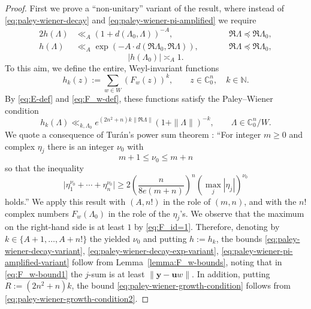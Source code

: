 \documentclass[11pt,oneside]{amsart}
\numberwithin{equation}{section}
\theoremstyle{remark}
\theoremstyle{plain}
\newcommand\NN{\mathbb{N}}
\newcommand\CC{\mathbb{C}}
\newcommand{\bu}{\mathbf{u}}
\newcommand{\by}{\mathbf{y}}
\renewcommand\leq{\leqslant}
\renewcommand\geq{\geqslant}
\begin{document}
\begin{proof} First we prove a ``non-unitary'' variant of the result, where instead of \eqref{eq:paley-wiener-decay} and \eqref{eq:paley-wiener-pi-amplified} we require
\begin{alignat}{2}
\label{eq:paley-wiener-decay-variant}
h(\Lambda)&\ll_A (1+d(\Lambda_0,\Lambda))^{-A},&&\qquad\Re\Lambda\preceq\Re\Lambda_0,\\
\label{eq:paley-wiener-decay-exp-variant}
h(\Lambda)&\ll_A \exp(-A\cdot d(\Re\Lambda_0,\Re\Lambda)),&&\qquad\Re\Lambda\preceq\Re\Lambda_0,
\end{alignat}
\begin{equation}\label{eq:paley-wiener-pi-amplified-variant}
|h(\Lambda_0)|\asymp_{A} 1.
\end{equation}
To this aim, we define the entire, Weyl-invariant functions
\[
h_k(z):= \sum_{w\in W} (F_w(z))^k, \qquad z\in\CC^n_0,\quad k\in\NN.
\]
By \eqref{eq:E-def} and \eqref{eq:F_w-def}, these functions satisfy the Paley--Wiener condition
\begin{equation}\label{eq:paley-wiener-growth-condition2}
h_k(\Lambda) \ll_{k,\Lambda_0} e^{(2n^2+n)k\|\Re\Lambda\|} (1+\|\Lambda\|)^{-k},\qquad \Lambda\in\CC^n_0/W.
\end{equation}
We quote a consequence of Turán's power sum theorem \cite[Cor. on p.~85]{Turan1984}: ``For integer $m\geq 0$ and complex $\eta_j$ there is an integer $\nu_0$ with
\[
m+1 \leq \nu_0 \leq m+n
\]
so that the inequality
\[
\bigl|\eta_1^{\nu_0}+\dotsb+\eta_n^{\nu_0}\bigr| \geq 2 \left(\frac{n}{8e(m+n)}\right)^n \left(\max_j |\eta_j|\right)^{\nu_0}
\]
holds.'' We apply this result with $(A,n!)$ in the role of $(m,n)$, and with the $n!$ complex numbers $F_w(\Lambda_0)$ in the role of the $\eta_j$'s. We observe that the maximum on the right-hand side is at least $1$ by \eqref{eq:F_id=1}. Therefore, denoting by $k\in\{A+1,\dotsc,A+n!\}$ the yielded $\nu_0$ and putting $h:=h_k$, the bounds \eqref{eq:paley-wiener-decay-variant}, \eqref{eq:paley-wiener-decay-exp-variant}, \eqref{eq:paley-wiener-pi-amplified-variant} follow from Lemma~\ref{lemma:F_w-bounds}, noting that in \eqref{eq:F_w-bound1} the $j$-sum is at least $\|\by-\bu w\|$.
In addition, putting $R:=(2n^2+n)k$, the bound \eqref{eq:paley-wiener-growth-condition} follows from \eqref{eq:paley-wiener-growth-condition2}.


\end{proof}
\end{document}
